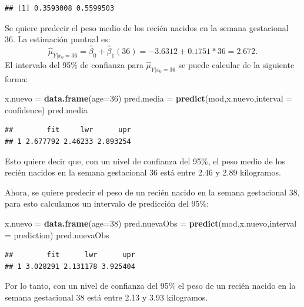 \documentclass[
]{article}
\newenvironment{Shaded}{\begin{snugshade}}{\end{snugshade}}
\newcommand{\AttributeTok}[1]{\textcolor[rgb]{0.13,0.29,0.53}{#1}}
\newcommand{\DecValTok}[1]{\textcolor[rgb]{0.00,0.00,0.81}{#1}}
\newcommand{\FunctionTok}[1]{\textcolor[rgb]{0.13,0.29,0.53}{\textbf{#1}}}
\newcommand{\NormalTok}[1]{#1}
\newcommand{\OtherTok}[1]{\textcolor[rgb]{0.56,0.35,0.01}{#1}}
\newcommand{\StringTok}[1]{\textcolor[rgb]{0.31,0.60,0.02}{#1}}
\begin{document}
\begin{verbatim}
## [1] 0.3593008 0.5599503
\end{verbatim}

Se quiere predecir el peso medio de los recién nacidos en la semana gestacional 36. La estimación puntual es:
\[
\widehat{\mu}_{Y|x_{0}=36} = \widehat{\beta}_{0} + \widehat{\beta}_{1}(36) = -3.6312 + 0.1751*36 = 2.672.
\]
El intervalo del 95\% de confianza para \(\widehat{\mu}_{Y|x_{0}=36}\) se puede calcular de la siguiente forma:

\begin{Shaded}
\begin{Highlighting}[]
\NormalTok{x.nuevo }\OtherTok{=} \FunctionTok{data.frame}\NormalTok{(}\AttributeTok{age=}\DecValTok{36}\NormalTok{)}
\NormalTok{pred.media }\OtherTok{=} \FunctionTok{predict}\NormalTok{(mod,x.nuevo,}\AttributeTok{interval =} \StringTok{\textquotesingle{}confidence\textquotesingle{}}\NormalTok{)}
\NormalTok{pred.media}
\end{Highlighting}
\end{Shaded}

\begin{verbatim}
##        fit     lwr      upr
## 1 2.677792 2.46233 2.893254
\end{verbatim}

Esto quiere decir que, con un nivel de confianza del 95\%, el peso medio de los recién nacidos en la semana gestacional 36 está entre 2.46 y 2.89 kilogramos.

Ahora, se quiere predecir el peso de un recién nacido en la semana gestacional 38, para esto calculamos un intervalo de predicción del 95\%:

\begin{Shaded}
\begin{Highlighting}[]
\NormalTok{x.nuevo }\OtherTok{=} \FunctionTok{data.frame}\NormalTok{(}\AttributeTok{age=}\DecValTok{38}\NormalTok{)}
\NormalTok{pred.nuevaObs }\OtherTok{=} \FunctionTok{predict}\NormalTok{(mod,x.nuevo,}\AttributeTok{interval =} \StringTok{\textquotesingle{}prediction\textquotesingle{}}\NormalTok{)}
\NormalTok{pred.nuevaObs}
\end{Highlighting}
\end{Shaded}

\begin{verbatim}
##        fit      lwr      upr
## 1 3.028291 2.131178 3.925404
\end{verbatim}

Por lo tanto, con un nivel de confianza del 95\% el peso de un recién nacido en la semana gestacional 38 está entre 2.13 y 3.93 kilogramos.
\end{document}
